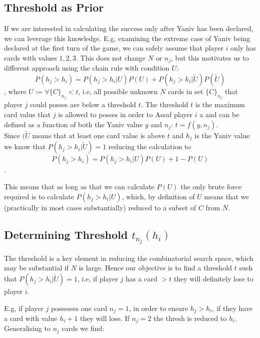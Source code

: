 \documentclass[10pt]{article}
\begin{document}
\subsection{Threshold  as Prior}
If we are interested in calculating the success only after Yaniv has been declared, we can leverage this knowledge.  
E.g, examining the extreme case of Yaniv being declared at the first turn of the game, we can safely assume that player $i$ only has cards with values $1,2,3$. 
This does not change $N$ or $n_j$, but this motivates us to different approach using the chain rule with condition $U$:  
\begin{equation*}
P(h_j >h_i) = P(h_j >h_i |U)P(U) + P(h_j >h_i |\widetilde{U})P(\widetilde{U})
\end{equation*}, 
where $U:=  \forall \{C\}_{n_j} < t$, i.e, all possible unknown $N$ cards in set  $\{C\}_{n_j}$ that player $j$ could posses  are below a threshold $t$.   
The threshold  $t$ is the maximum card value that $j$ is allowed to posses in order to Assaf player $i$ a
and can be defined as a function of both the Yaniv value $y$ and $n_j$: $t=f(y, n_j)$. \\
Since $(\widetilde{U}$ means that at least one card value is above $t$ and $h_j$ is the Yaniv value we know that $P(h_j >h_i |\widetilde{U})=1$ reducing the calculation to 
\begin{equation*}
P(h_j >h_i) = P(h_j >h_i |U)P(U) + 1 - P(U)
\end{equation*}.   

This means that as long as that we can calculate $P(U)$ the only brute force required is to calculate $ P(h_j >h_i |U)$, 
which, by definition of $U$ means that we (practically in most cases substantially) reduced to a subset of $C$ from $N$.


\subsection{Determining Threshold $t_{n_j}(h_i)$}
The threshold is a key element in reducing the combinatorial search space, which may be substantial if $N$ is large.  
Hence our objective is to find a threshold $t$ such that $P(h_j >h_i |\widetilde{U})=1$, i.e, if player $j$ has a card $>t$ they 
will definitely lose to player $i$.  

E.g, if player $j$ possesses one card $n_j=1$,  in order to ensure $h_j > h_i$, if they have a card with value $h_i + 1$ they will lose. 
If $n_j=2$ the thresh is reduced to $h_i$. Generalising to $n_j$ cards we find:  
 
\end{document}
